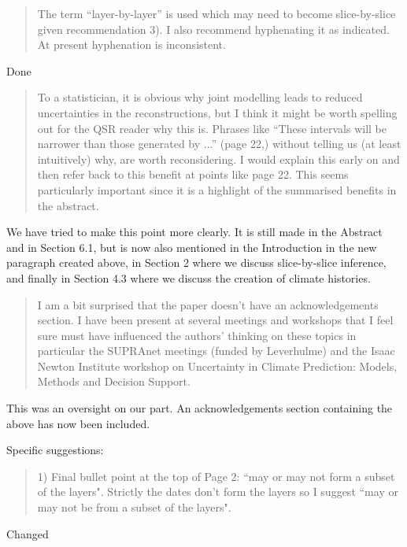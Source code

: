 \documentclass[a4paper,11pt]{article}
\begin{document}
\begin{framed} \begin{quote}
The term ``layer-by-layer'' is used which may need to become slice-by-slice given recommendation 3). I also recommend hyphenating it as indicated.  At present hyphenation is inconsistent.
\end{quote} \end{framed}
Done

\begin{framed} \begin{quote}
To a statistician, it is obvious why joint modelling leads to reduced uncertainties in the reconstructions, but I think it might be worth spelling out for the QSR reader why this is.  Phrases like ``These intervals will be narrower than those generated by ...'' (page 22,) without telling us (at least intuitively) why, are worth reconsidering.  I would explain this early on and then refer back to this benefit at points like page 22. This seems particularly important since it is a highlight of the summarised benefits in the abstract.
\end{quote} \end{framed}

We have tried to make this point more clearly. It is still made in the Abstract and in Section 6.1, but is now also mentioned in the Introduction in the new paragraph created above, in Section 2 where we discuss slice-by-slice inference, and finally in Section 4.3 where we discuss the creation of climate histories.

\begin{framed} \begin{quote}
I am a bit surprised that the paper doesn't have an acknowledgements section.  I have been present at several meetings and workshops that I feel sure must have influenced the authors' thinking on these topics in particular the SUPRAnet meetings (funded by Leverhulme) and the Isaac Newton Institute workshop on Uncertainty in Climate Prediction: Models, Methods and Decision Support.
\end{quote} \end{framed}
This was an oversight on our part. An acknowledgements section containing the above has now been included. 

Specific suggestions:
\begin{framed} \begin{quote}
1) Final bullet point at the top of Page 2: ``may or may not form a subset of the layers". Strictly the dates don't form the layers so I suggest ``may or may not be from a subset of the layers".
\end{quote} \end{framed}
Changed
\end{document}
